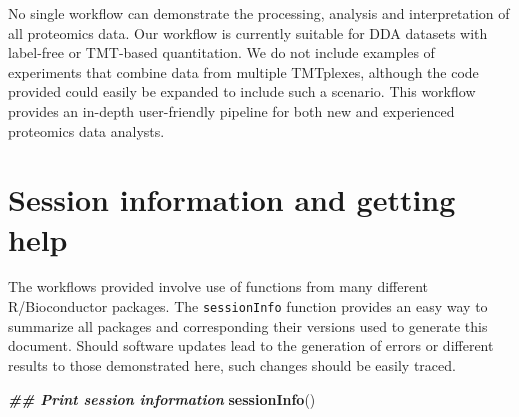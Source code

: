 \documentclass[9pt,a4paper,]{extarticle}
\newenvironment{Shaded}{\begin{snugshade}}{\end{snugshade}}
\newcommand{\DocumentationTok}[1]{\textcolor[rgb]{0.56,0.35,0.01}{\textbf{\textit{#1}}}}
\newcommand{\FunctionTok}[1]{\textcolor[rgb]{0.13,0.29,0.53}{\textbf{#1}}}
\newcommand{\NormalTok}[1]{#1}
\begin{document}
No single workflow can demonstrate the processing, analysis and interpretation
of all proteomics data. Our workflow is currently suitable for DDA datasets with
label-free or TMT-based quantitation. We do not include examples of experiments
that combine data from multiple TMTplexes, although the code provided could
easily be expanded to include such a scenario. This workflow provides an in-depth
user-friendly pipeline for both new and experienced proteomics data analysts.

\hypertarget{session-information-and-getting-help}{%
\section{Session information and getting help}\label{session-information-and-getting-help}}

The workflows provided involve use of functions from many different
R/Bioconductor packages. The \texttt{sessionInfo} function provides an easy way to
summarize all packages and corresponding their versions used to generate this
document. Should software updates lead to the generation of errors or different
results to those demonstrated here, such changes should be easily traced.

\begin{Shaded}
\begin{Highlighting}[]
\DocumentationTok{\#\# Print session information}
\FunctionTok{sessionInfo}\NormalTok{()}
\end{Highlighting}
\end{Shaded}
\end{document}
